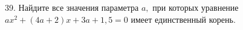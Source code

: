 39. Найдите все значения параметра $a,$ при которых уравнение $ax^2+(4a+2)x+3a+1,5=0$ имеет единственный корень.\\
